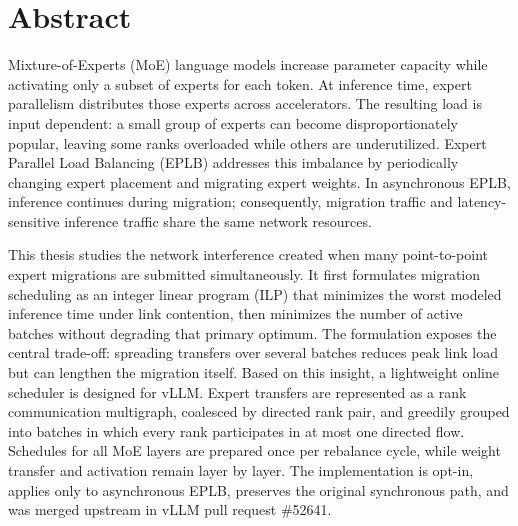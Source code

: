 \documentclass{Configuration_Files/PoliMi3i_thesis}
\newcommand{\prnumber}{\#52641}
\begin{document}

\pagestyle{empty}
\frontmatter


\startpreamble
\setcounter{page}{1}

\chapter*{Abstract}
Mixture-of-Experts (MoE) language models increase parameter capacity while
activating only a subset of experts for each token. At inference time, expert
parallelism distributes those experts across accelerators. The resulting load
is input dependent: a small group of experts can become disproportionately
popular, leaving some ranks overloaded while others are underutilized. Expert
Parallel Load Balancing (EPLB) addresses this imbalance by periodically
changing expert placement and migrating expert weights. In asynchronous EPLB,
inference continues during migration; consequently, migration traffic and
latency-sensitive inference traffic share the same network resources.

This thesis studies the network interference created when many point-to-point
expert migrations are submitted simultaneously. It first formulates migration
scheduling as an integer linear program (ILP) that minimizes the worst modeled
inference time under link contention, then minimizes the number of active
batches without degrading that primary optimum. The formulation exposes the central
trade-off: spreading transfers over several batches reduces peak link load but
can lengthen the migration itself. Based on this insight, a lightweight online
scheduler is designed for vLLM. Expert transfers are represented as a rank
communication multigraph, coalesced by directed rank pair, and greedily grouped
into batches in which every rank participates in at most one directed flow.
Schedules for all MoE layers are prepared once per rebalance cycle, while
weight transfer and activation remain layer by layer. The implementation is opt-in, applies
only to asynchronous EPLB, preserves the original synchronous path, and was
merged upstream in vLLM pull request \prnumber.
\end{document}
